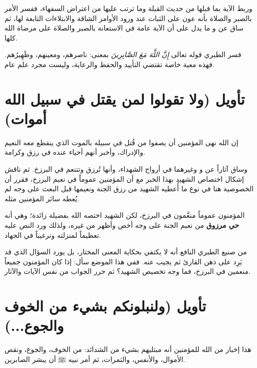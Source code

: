 وربط  الآية بما قبلها من حديث القبلة وما ترتب عليها من اعتراض السفهاء، ففسر الأمر بالصبر والصلاة بأنه عون على الثبات عند ورود الأوامر الشاقة والابتلاءات التابعة لها، ثم ساق عن  و ما يدل على أن الآية عامة في الاستعانة بالصبر والصلاة على مرضاة الله كلها.

\begin{fawaid}
فسر الطبري قوله تعالى \textit{إِنَّ اللَّهَ مَعَ الصَّابِرِينَ} بمعنى: ناصرهم، ومعينهم، وظَهِيرُهم. فهذه معية خاصة تقتضي التأييد والحفظ والرعاية، وليست مجرد علم عام.
\end{fawaid}

\separator

\section{تأويل (ولا تقولوا لمن يقتل في سبيل الله أموات)}
 إن الله نهى المؤمنين أن يصفوا من قُتل في سبيله بالموت الذي ينقطع معه النعيم والإدراك، وأخبر أنهم أحياء عنده في رزق وكرامة.

وساق  آثاراً عن  و وغيرهما في أرواح الشهداء، وأنها تُرزق وتتنعم في البرزخ. ثم ناقش إشكال اختصاص الشهيد بهذا الخبر مع أن المؤمنين عموماً في نعيم البرزخ، فقرر أن الخصوصية هنا في نوع ما أُعطيه الشهيد من رزق الجنة ونعيمها قبل البعث على وجه لم يُعطه سائر المؤمنين مثله.

\begin{fawaid}
المؤمنون عموماً منعَّمون في البرزخ، لكن الشهيد اختصه الله بفضيلة زائدة؛ وهي أنه \textbf{حي مرزوق} من نعيم الجنة على وجه أخص وأظهر من غيره، ولذلك ورد النص عليه تعظيماً لمنزلته وترغيباً في الجهاد.
\end{fawaid}

\begin{fawaid}
من صنيع الطبري النافع أنه لا يكتفي بحكاية المعنى المختار، بل يورد السؤال الذي قد يَرِد على ذهن القارئ ثم يجيب عنه. ففي هذا الموضع سأل: إذا كان المؤمنون جميعاً منعمين في البرزخ، فما وجه تخصيص الشهيد؟ ثم حرر الجواب من نفس الآيات والآثار.
\end{fawaid}

\separator

\section{تأويل (ولنبلونكم بشيء من الخوف والجوع...)}
 هذا إخبار من الله للمؤمنين أنه مبتليهم بشيء من الشدائد: من الخوف، والجوع، ونقص الأموال، والأنفس، والثمرات، ثم أمر نبيه ﷺ أن يبشر الصابرين.

